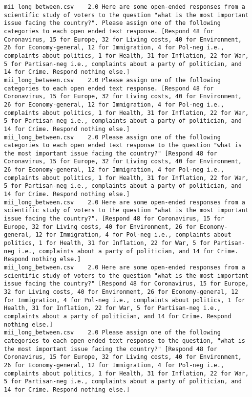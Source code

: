 \begin{lstlisting}[label=lst:promptvariants]
mii_long_between.csv	2.0	Here are some open-ended responses from a scientific study of voters to the question "what is the most important issue facing the country?". Please assign one of the following categories to each open ended text response. [Respond 48 for Coronavirus, 15 for Europe, 32 for Living costs, 40 for Environment, 26 for Economy-general, 12 for Immigration, 4 for Pol-neg i.e., complaints about politics, 1 for Health, 31 for Inflation, 22 for War, 5 for Partisan-neg i.e., complaints about a party of politician, and 14 for Crime. Respond nothing else.]
mii_long_between.csv	2.0	Please assign one of the following categories to each open ended text response. [Respond 48 for Coronavirus, 15 for Europe, 32 for Living costs, 40 for Environment, 26 for Economy-general, 12 for Immigration, 4 for Pol-neg i.e., complaints about politics, 1 for Health, 31 for Inflation, 22 for War, 5 for Partisan-neg i.e., complaints about a party of politician, and 14 for Crime. Respond nothing else.]
mii_long_between.csv	2.0	Please assign one of the following categories to each open ended text response to the question "what is the most important issue facing the country?" [Respond 48 for Coronavirus, 15 for Europe, 32 for Living costs, 40 for Environment, 26 for Economy-general, 12 for Immigration, 4 for Pol-neg i.e., complaints about politics, 1 for Health, 31 for Inflation, 22 for War, 5 for Partisan-neg i.e., complaints about a party of politician, and 14 for Crime. Respond nothing else.]
mii_long_between.csv	2.0	Here are some open-ended responses from a scientific study of voters to the question "what is the most important issue facing the country?". [Respond 48 for Coronavirus, 15 for Europe, 32 for Living costs, 40 for Environment, 26 for Economy-general, 12 for Immigration, 4 for Pol-neg i.e., complaints about politics, 1 for Health, 31 for Inflation, 22 for War, 5 for Partisan-neg i.e., complaints about a party of politician, and 14 for Crime. Respond nothing else.]
mii_long_between.csv	2.0	Here are some open-ended responses from a scientific study of voters to the question "what is the most important issue facing the country?" [Respond 48 for Coronavirus, 15 for Europe, 32 for Living costs, 40 for Environment, 26 for Economy-general, 12 for Immigration, 4 for Pol-neg i.e., complaints about politics, 1 for Health, 31 for Inflation, 22 for War, 5 for Partisan-neg i.e., complaints about a party of politician, and 14 for Crime. Respond nothing else.]
mii_long_between.csv	2.0	Please assign one of the following categories to each open ended text response to the question, "what is the most important issue facing the country?" [Respond 48 for Coronavirus, 15 for Europe, 32 for Living costs, 40 for Environment, 26 for Economy-general, 12 for Immigration, 4 for Pol-neg i.e., complaints about politics, 1 for Health, 31 for Inflation, 22 for War, 5 for Partisan-neg i.e., complaints about a party of politician, and 14 for Crime. Respond nothing else.]

\end{lstlisting}
